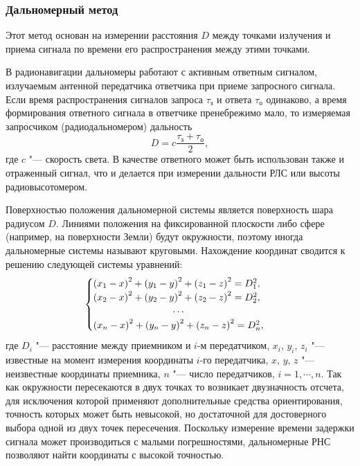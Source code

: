 \documentclass[../main.tex]{subfiles}
\begin{document}
\subsubsection{Дальномерный метод}
Этот метод основан на измерении расстояния $D$ между точками излучения и приема сигнала по времени его распространения между этими точками.

В радионавигации дальномеры работают с активным ответным сигналом, излучаемым антенной передатчика ответчика при приеме запросного сигнала. Если время распространения сигналов запроса $\tau_{\text{з}}$ и ответа $\tau_{\text{о}}$ одинаково, а время формирования ответного сигнала в ответчике пренебрежимо мало, то измеряемая запросчиком (радиодальномером) дальность
\begin{equation*}
    D = c \frac{\tau_{\text{з}} + \tau_{\text{о}}}{2},
\end{equation*}
где $c$ "--- скорость света. В качестве ответного может быть использован также и отраженный сигнал, что и делается при измерении дальности РЛС или высоты радиовысотомером.

Поверхностью положения дальномерной системы является поверхность шара радиусом $D$. Линиями положения на фиксированной плоскости либо сфере (например, на поверхности Земли) будут окружности, поэтому иногда дальномерные системы называют круговыми. Нахождение координат сводится к решению следующей системы уравнений:
\begin{equation*}
    \begin{cases}
        \left(x_1 - x\right)^2 + \left(y_1 - y\right)^2 + \left(z_1 - z\right)^2 = D_1^2, \\
        \left(x_2 - x\right)^2 + \left(y_2 - y\right)^2 + \left(z_2 - z\right)^2 = D_2^2, \\
        \hfil \cdots \\
        \left(x_n - x\right)^2 + \left(y_n - y\right)^2 + \left(z_n - z\right)^2 = D_n^2, \\
    \end{cases}
\end{equation*}
где $D_i$ "--- расстояние между приемником и $i$-м передатчиком, $x_i$, $y_i$, $z_i$ "--- известные на момент измерения координаты $i$-го передатчика, $x$, $y$, $z$ "--- неизвестные координаты приемника, $n$ "--- число передатчиков, $i = 1,\cdots, n$. Так как окружности пересекаются в двух точках то возникает двузначность отсчета, для исключения которой применяют дополнительные средства ориентирования, точность которых может быть невысокой, но достаточной для достоверного выбора одной из двух точек пересечения. Поскольку измерение времени задержки сигнала может производиться с малыми погрешностями, дальномерные РНС позволяют найти координаты с высокой точностью.
\end{document}
